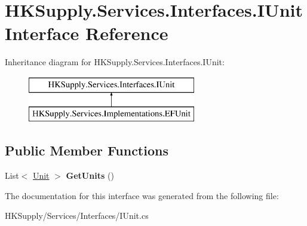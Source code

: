 \hypertarget{interface_h_k_supply_1_1_services_1_1_interfaces_1_1_i_unit}{}\section{H\+K\+Supply.\+Services.\+Interfaces.\+I\+Unit Interface Reference}
\label{interface_h_k_supply_1_1_services_1_1_interfaces_1_1_i_unit}
Inheritance diagram for H\+K\+Supply.\+Services.\+Interfaces.\+I\+Unit\+:\begin{figure}[H]
\begin{center}
\leavevmode
\includegraphics[height=2.000000cm]{interface_h_k_supply_1_1_services_1_1_interfaces_1_1_i_unit}
\end{center}
\end{figure}
\subsection*{Public Member Functions}
\begin{DoxyCompactItemize}
\item 
\mbox{\label{interface_h_k_supply_1_1_services_1_1_interfaces_1_1_i_unit_aef64b3bfc050d48a791e9f9eb99ddc80}} 
List$<$ \mbox{\hyperlink{class_h_k_supply_1_1_models_1_1_unit}{Unit}} $>$ {\bfseries Get\+Units} ()
\end{DoxyCompactItemize}


The documentation for this interface was generated from the following file\+:\begin{DoxyCompactItemize}
\item 
H\+K\+Supply/\+Services/\+Interfaces/I\+Unit.\+cs\end{DoxyCompactItemize}

